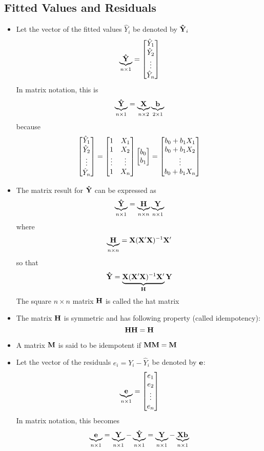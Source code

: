 \subsection{Fitted Values and Residuals}
\begin{itemize}
\item Let the vector of the fitted values $\hat{Y}_i$ be denoted by $\mathbf{\hat{Y}}_i$ $$ \underbrace{\mathbf{\hat{Y}}}_{n \times 1} = \begin{bmatrix} \hat{Y}_1 \\ \hat{Y}_2 \\ \vdots \\ \hat{Y}_n \end{bmatrix} $$ In matrix notation, this is $$ \underbrace{\mathbf{\hat{Y}}}_{n \times 1} = \underbrace{\mathbf{X}}_{n \times 2} \underbrace{\mathbf{b}}_{2 \times 1} $$ because $$ \begin{bmatrix} \hat{Y}_1 \\ \hat{Y}_2 \\ \vdots \\ \hat{Y}_n \end{bmatrix} = \begin{bmatrix} 1 & X_1 \\ 1 & X_2 \\ \vdots & \vdots \\ 1 & X_n \end{bmatrix} \begin{bmatrix} b_0 \\ b_1 \end{bmatrix} = \begin{bmatrix} b_0 + b_1X_1 \\ b_0 + b_1X_2 \\ \vdots \\ b_0 + b_1X_n \end{bmatrix} $$ 
\item The matrix result for $\mathbf{\hat{Y}}$ can be expressed as $$ \underbrace{\mathbf{\hat{Y}}}_{n \times 1} = \underbrace{\mathbf{H}}_{n \times n} \underbrace{\mathbf{Y}}_{n \times 1} $$ where $$ \underbrace{\mathbf{H}}_{n \times n} = \mathbf{X}(\mathbf{X}'\mathbf{X})^{-1}\mathbf{X}' $$ so that $$ \mathbf{\hat{Y}} = \underbrace{\mathbf{X}(\mathbf{X}'\mathbf{X})^{-1}\mathbf{X}'}_{\mathbf{H}} \mathbf{Y} $$ The square $n \times n$ matrix $\mathbf{H}$ is called the hat matrix
\item The matrix $\mathbf{H}$ is symmetric and has following property (called idempotency): $$ \mathbf{HH} = \mathbf{H} $$ 
\item A matrix $\mathbf{M}$ is said to be idempotent if $\mathbf{MM} = \mathbf{M}$ 
\item Let the vector of the residuals $e_i = Y_i - \hat{Y}_i$ be denoted by $\mathbf{e}$: $$ \underbrace{\mathbf{e}}_{n \times 1} = \begin{bmatrix} e_1 \\ e_2 \\ \vdots \\ e_n \end{bmatrix} $$ In matrix notation, this becomes 
$$ \underbrace{\mathbf{e}}_{n \times 1} = \underbrace{\mathbf{Y}}_{n \times 1} - \underbrace{\mathbf{\hat{Y}}}_{n \times 1} = \underbrace{\mathbf{Y}}_{n \times 1} - \underbrace{\mathbf{Xb}}_{n \times 1} $$ 

\end{itemize}
